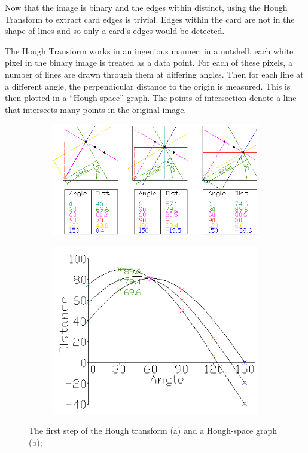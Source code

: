 \documentclass[a4paper,12pt,notitlepage]{article}
\begin{document}
			Now that the image is binary and the edges within distinct, using the Hough Transform to extract card edges is trivial. Edges within the card are not in the shape of lines and so only a card's edges would be detected.

			The Hough Transform works in an ingenious manner; in a nutshell, each white pixel in the binary image is treated as a data point. For each of these pixels, a number of lines are drawn through them at differing angles. Then for each line at a different angle, the perpendicular distance to the origin is measured. This is then plotted in a ``Hough space'' graph. The points of intersection denote a line that intersects many points in the original image. 

			\begin{figure}[H]
				\centering
				\begin{subfigure}[b]{0.55\textwidth}
					\centering
					\includegraphics[width=\textwidth]{hough1}
					\caption{}
				\end{subfigure}
				\begin{subfigure}[b]{0.4\textwidth}
					\centering
					\includegraphics[width=\textwidth]{hough2}
					\caption{}
				\end{subfigure}
				\caption{The first step of the Hough transform (a) and a Hough-space graph (b); \autocite{wiki}}
				\label{fig:houghmath}
			\end{figure}
\end{document}
